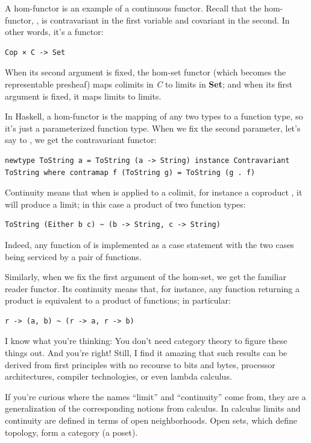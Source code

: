 A hom-functor is an example of a continuous functor. Recall that the
hom-functor, , is contravariant in the first variable
and covariant in the second. In other words, it's a functor:

\begin{verbatim}
Cop × C -> Set
\end{verbatim}

When its second argument is fixed, the hom-set functor (which becomes
the representable presheaf) maps colimits in \emph{C} to limits in
\textbf{Set}; and when its first argument is fixed, it maps limits to
limits.

In Haskell, a hom-functor is the mapping of any two types to a function
type, so it's just a parameterized function type. When we fix the second
parameter, let's say to , we get the contravariant
functor:

\begin{verbatim}
newtype ToString a = ToString (a -> String) instance Contravariant ToString where contramap f (ToString g) = ToString (g . f)
\end{verbatim}

Continuity means that when  is applied to a colimit,
for instance a coproduct , it will produce a limit;
in this case a product of two function types:

\begin{verbatim}
ToString (Either b c) ~ (b -> String, c -> String)
\end{verbatim}

Indeed, any function of  is implemented as a case
statement with the two cases being serviced by a pair of functions.

Similarly, when we fix the first argument of the hom-set, we get the
familiar reader functor. Its continuity means that, for instance, any
function returning a product is equivalent to a product of functions; in
particular:

\begin{verbatim}
r -> (a, b) ~ (r -> a, r -> b)
\end{verbatim}

I know what you're thinking: You don't need category theory to figure
these things out. And you're right! Still, I find it amazing that such
results can be derived from first principles with no recourse to bits
and bytes, processor architectures, compiler technologies, or even
lambda calculus.

If you're curious where the names ``limit'' and ``continuity'' come
from, they are a generalization of the corresponding notions from
calculus. In calculus limits and continuity are defined in terms of open
neighborhoods. Open sets, which define topology, form a category (a
poset).

